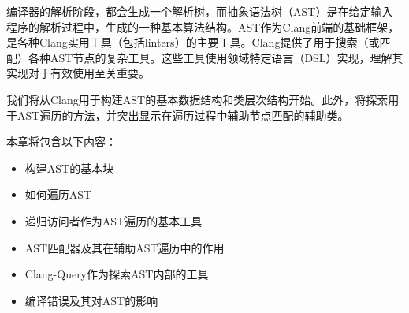 编译器的解析阶段，都会生成一个解析树，而抽象语法树（AST）是在给定输入程序的解析过程中，生成的一种基本算法结构。AST作为Clang前端的基础框架，是各种Clang实用工具（包括linters）的主要工具。Clang提供了用于搜索（或匹配）各种AST节点的复杂工具。这些工具使用领域特定语言（DSL）实现，理解其实现对于有效使用至关重要。

我们将从Clang用于构建AST的基本数据结构和类层次结构开始。此外，将探索用于AST遍历的方法，并突出显示在遍历过程中辅助节点匹配的辅助类。

本章将包含以下内容：

\begin{itemize}
\item
构建AST的基本块

\item
如何遍历AST

\item
递归访问者作为AST遍历的基本工具

\item
AST匹配器及其在辅助AST遍历中的作用

\item
Clang-Query作为探索AST内部的工具

\item
编译错误及其对AST的影响
\end{itemize}